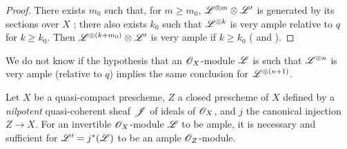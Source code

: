 \begin{proof}
There exists $m_0$ such that, for $m\geq m_0$, $\mathscr{L}^{\otimes m}\otimes\mathscr{L}'$ is generated by its sections over $X$ ;
there also exists $k_0$ such that $\mathscr{L}^{\otimes k}$ is very ample relative to $q$ for $k\geq k_0$.
Then $\mathscr{L}^{\otimes(k+m_0)}\otimes\mathscr{L}'$ is very ample if $k\geq k_0$ ( and ).
\end{proof}

\begin{remark}[4.5.12]
\label{II.4.5.12}
We do not know if the hypothesis that an $\mathscr{O}_X$-module $\mathscr{L}$ is such that $\mathscr{L}^{\otimes n}$ is very ample (relative to $q$) implies the same conclusion for $\mathscr{L}^{\otimes(n+1)}$.
\end{remark}

\begin{proposition}[4.5.13]
\label{II.4.5.13}
Let $X$ be a quasi-compact prescheme, $Z$ a closed prescheme of $X$ defined by a \emph{nilpotent} quasi-coherent sheaf $\mathscr{J}$ of ideals of $\mathscr{O}_X$, and $j$ the canonical injection $Z\to X$.
For an invertible $\mathscr{O}_X$-module $\mathscr{L}$ to be ample, it is necessary and sufficient for $\mathscr{L}'=j^*(\mathscr{L})$ to be an ample $\mathscr{O}_Z$-module.
\end{proposition}

